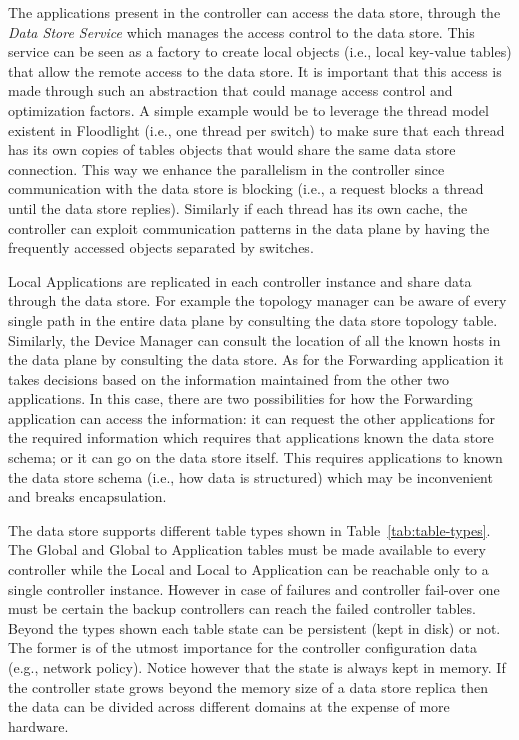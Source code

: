 The applications present in the controller can access the data store, through the \emph{Data Store Service}  which manages the access control to the data store. 
This service can be seen as a factory to create local objects (i.e., local key-value tables) that allow the remote access to the data store. 
It is important that this access is made through such an abstraction that could manage access control and optimization factors. A simple example would be to leverage the thread model existent in Floodlight (i.e., one thread per switch) to make sure that each thread has its own copies of tables objects that would share the same data store connection. 
This way we enhance the parallelism in the controller since communication with the data store is blocking (i.e., a request blocks a thread until the data store replies). Similarly if each thread has its own cache, the controller can exploit communication patterns in the data plane  by having the frequently accessed objects separated by switches. 


Local Applications are replicated in each controller instance and share data through the data store. For example the topology manager can be aware of every single path in the entire data plane by consulting the data store topology table. Similarly, the Device Manager can consult the location of all the known hosts in the data plane by consulting the data store. As for the Forwarding application it takes decisions based on the information maintained from the other two applications. 
In this case, there are two possibilities for how the Forwarding application can access the information: it can request the other applications for the required information which requires that applications known the data store schema; or it can go on the data store itself.
This requires applications to known the data store schema (i.e., how data is structured) which may be inconvenient and breaks encapsulation. 

The data store supports different table types shown in Table~\ref{tab:table-types}. The Global and Global to Application tables must be made available to every controller while the Local and Local to Application can be reachable only to a single controller instance. However in case of failures and controller fail-over one must be certain the backup controllers can reach the failed controller tables. Beyond the types shown each table state can be persistent (kept in disk) or not. The former is of the utmost importance for the controller configuration data (e.g., network policy). Notice however that the state is always kept in memory. If the controller state grows beyond the memory size  of a data store replica then the data can be divided across different domains at the expense of more hardware. 


